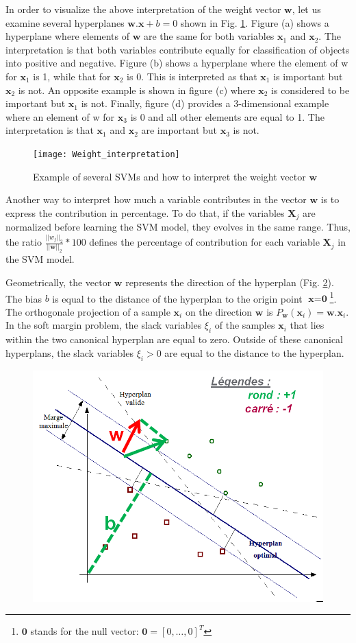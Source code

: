 In order to visualize the above interpretation of the weight vector $\textbf{w}$, let us examine several hyperplanes $\textbf{w}.\textbf{x}+b=0$ shown in Fig. \ref*{fig:Weight_interpretation}. Figure (a) shows a hyperplane where elements of $\textbf{w}$ are the same for both variables $\textbf{x}_1$ and $\textbf{x}_2$. The interpretation is that both variables contribute equally for classification of objects into positive and negative. Figure (b) shows a hyperplane where the element of w for $\textbf{x}_1$ is 1, while that for $\textbf{x}_2$ is 0. This is interpreted as that $\textbf{x}_1$ is important but $\textbf{x}_2$ is not. An opposite example is shown in figure (c) where $\textbf{x}_2$ is considered to be important but $\textbf{x}_1$ is not. Finally, figure (d) provides a 3-dimensional example where an element of w for $\textbf{x}_3$ is 0 and all other elements are equal to 1. The interpretation is that $\textbf{x}_1$ and $\textbf{x}_2$ are important but $\textbf{x}_3$ is not.

\begin{figure}[h!]
	\centering
	\texttt{[image: Weight\_interpretation]}
	\caption{Example of several SVMs and how to interpret the weight vector $\textbf{w}$}
	\label{fig:Weight_interpretation}
\end{figure}

Another way to interpret how much a variable contributes in the vector $\textbf{w}$ is to express the contribution in percentage. To do that, if the variables $\textbf{X}_j$ are normalized before learning the SVM model, they evolves in the same range. Thus, the ratio $\frac{||w_j||_2}{||\textbf{w}||_2}*100$ defines the percentage of contribution for each variable $\textbf{X}_j$ in the SVM model.

Geometrically, the vector $\textbf{w}$ represents the direction of the hyperplan (Fig. \ref{fig:SVM_interpretation}). The bias $b$ is equal to the distance of the hyperplan to the origin point $\textbf{x}=\textbf{0}$\footnote{$\textbf{0}$ stands for the null vector: $\textbf{0} = [0, \ldots ,0]^T$}. The orthogonale projection of a sample $\textbf{x}_i$ on the direction $\textbf{w}$ is $P_\textbf{w}(\textbf{x}_i) = \textbf{w}.\textbf{x}_i$. In the soft margin problem, the slack variables $\xi_i$ of the samples $\textbf{x}_i$ that lies within the two canonical hyperplan are equal to zero. Outside of these canonical hyperplans, the slack variables $\xi_i > 0$ are equal to the distance to the hyperplan.


\begin{figure}[h!]
	\centering
	\includegraphics[width=0.5\linewidth]{images/SVM_interpretation}
	\caption{}
	\label{fig:SVM_interpretation}
\end{figure}


